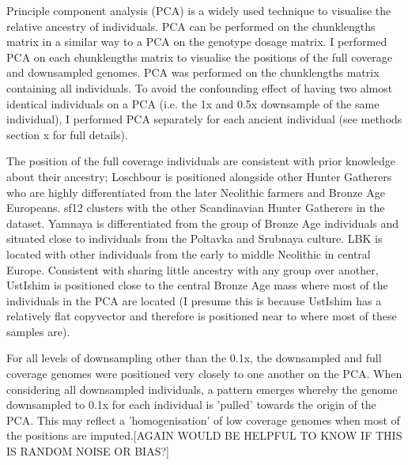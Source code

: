 Principle component analysis (PCA) is a widely used technique to visualise the relative ancestry of individuals. PCA can be performed on the chunklengths matrix in a similar way to a PCA on the genotype dosage matrix. I performed PCA on each chunklengths matrix to visualise the positions of the full coverage and downsampled genomes. PCA was performed on the chunklengths matrix containing all individuals. To avoid the confounding effect of having two almost identical individuals on a PCA (i.e. the 1x and 0.5x downsample of the same individual), I performed PCA separately for each ancient individual (see methods section x for full details). 

The position of the full coverage individuals are consistent with prior knowledge about their ancestry; Loschbour is positioned alongside other Hunter Gatherers who are highly differentiated from the later Neolithic farmers and Bronze Age Europeans. sf12 clusters with the other Scandinavian Hunter Gatherers in the dataset. Yamnaya is differentiated from the group of Bronze Age individuals and situated close to individuals from the Poltavka and Srubnaya culture. LBK is located with other individuals from the early to middle Neolithic in central Europe. Consistent with sharing little ancestry with any group over another, UstIshim is positioned close to the central Bronze Age mass where most of the individuals in the PCA are located (I presume this is because UstIshim has a relatively flat copyvector and therefore is positioned near to where most of these samples are). 

For all levels of downsampling other than the 0.1x, the downsampled and full coverage genomes were positioned very closely to one another on the PCA. When considering all downsampled individuals, a pattern emerges whereby the genome downsampled to 0.1x for each individual is 'pulled' towards the origin of the PCA. {\color{red}This may reflect a 'homogenisation' of low coverage genomes when most of the positions are imputed.[AGAIN WOULD BE HELPFUL TO KNOW IF THIS IS RANDOM NOISE OR BIAS?]}

